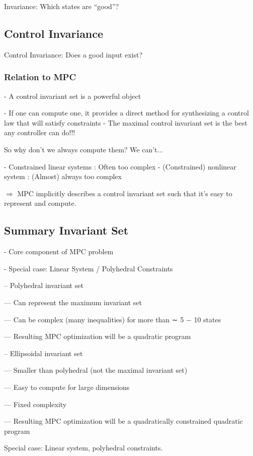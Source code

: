Invariance: Which states are “good”?


\subsection{Control Invariance}

Control Invariance: Does a good input exist?


\subsubsection{Relation to MPC}

- A control invariant set is a powerful object

- If one can compute one, it provides a direct method for synthesizing a
control law that will satisfy constraints
- The maximal control invariant set is the best any controller can do!!!

So why don’t we always compute them?
We can’t...

- Constrained linear systems : Often too complex
- (Constrained) nonlinear system : (Almost) always too complex

$\Rightarrow$ MPC implicitly describes a control invariant set
such that it’s easy to represent and compute.

\subsection{Summary Invariant Set}

- Core component of MPC problem

- Special case: Linear System / Polyhedral Constraints

-- Polyhedral invariant set

--- Can represent the maximum invariant set

--- Can be complex (many inequalities) for more than ∼ 5 − 10 states

--- Resulting MPC optimization will be a quadratic program

-- Ellipsoidal invariant set

--- Smaller than polyhedral (not the maximal invariant set)

--- Easy to compute for large dimensions

--- Fixed complexity

--- Resulting MPC optimization will be a
quadratically constrained quadratic program

Special case: Linear system, polyhedral constraints.

